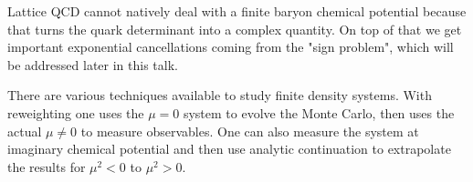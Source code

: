 \documentclass[12pt,a4paper,dvipsnames,usenames]{beamer}
\begin{document}
\begin{frame}
{    %
    \par
  }

  \begin{overlayarea}{\textwidth}{3em}
  \end{overlayarea}

  {
    Lattice QCD cannot natively deal with a finite baryon chemical potential because that turns the quark determinant into a
    complex quantity. On top of that we get important exponential cancellations coming from the "sign problem", which will be
    addressed later in this talk.
  }

  {
    There are various techniques available to study finite density systems. With reweighting one uses the $\mu = 0$ system to
    evolve the Monte Carlo, then uses the actual $\mu \neq 0$ to measure observables. One can also measure the system at
    imaginary chemical potential and then use analytic continuation to extrapolate the results for $\mu^2 < 0$ to $\mu^2 > 0$.
  }


\end{frame}
\end{document}
